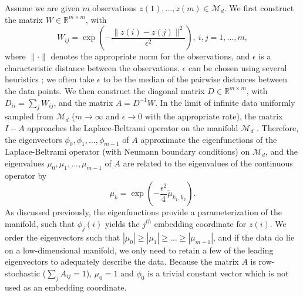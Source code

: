 \documentclass[preprint]{elsarticle}
\begin{document}
Assume we are given $m$ observations $z(1), \dots, z(m) \in \mathcal{M}_d$. 
%
We first construct the matrix $W \in \mathbb{R}^{m \times m}$, with
\begin{equation} \label{eq:W}
W_{ij} = \exp \left( -\frac{\|z(i) - z(j) \|^2}{\epsilon^2} \right), \ i,j=1,\ldots,m,
\end{equation}
where $\| \cdot \|$ denotes the appropriate norm for the observations, and $\epsilon$ is a characteristic distance between the observations. 
%
$\epsilon$ can be chosen using several heuristics \cite{coifman2008graph, rohrdanz2011determination}; we often take $\epsilon$ to be the median of the pairwise distances between the data points.
%
We then construct the diagonal matrix $D \in \mathbb{R}^{m \times m}$, with $D_{ii} = \sum_j W_{ij}$, and the matrix $A  = D^{-1} W.$
%
In the limit of infinite data uniformly sampled from $\mathcal{M}_d$ ($m \rightarrow \infty$ and $\epsilon \rightarrow 0$ with the appropriate rate), the matrix $I-A$ approaches the Laplace-Beltrami operator on the manifold $\mathcal{M}_d$ \cite{coifman2006geometric}. 
%
Therefore, the eigenvectors $\phi_0, \phi_1, \dots, \phi_{m-1}$ of $A$ approximate the eigenfunctions of the Laplace-Beltrami operator (with Neumann boundary conditions) on $\mathcal{M}_d$,
and the eigenvalues $\mu_0, \mu_1, \dots, \mu_{m-1}$ of $A$ are related to the eigenvalues of the continuous operator by 
\begin{equation} \label{eq:evals_relationship}
\mu_k = \exp \left( -\frac{\epsilon^2}{4} \tilde{\mu}_{k_1, k_2}  \right).
\end{equation}
%
As discussed previously, the eigenfunctions provide a parameterization of the manifold, such that $\phi_{j}(i)$ yields the $j^{th}$ embedding coordinate for $z(i)$.
%
We order the eigenvectors such that $|\mu_0| \ge |\mu_1| \ge \dots \ge |\mu_{m-1}|$, and if the data do lie on a low-dimensional manifold, we only need to retain a few of the leading eigenvectors to adequately describe the data.
%
Because the matrix $A$ is row-stochastic ($\sum_j A_{ij} = 1$),  $\mu_0 = 1$ and $\phi_0$ is a trivial constant vector which is not used as an embedding coordinate.
\end{document}

